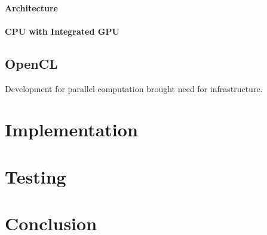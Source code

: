 \subsubsection*{Architecture}


\subsubsection*{CPU with Integrated GPU}


\section{OpenCL}
Development for parallel computation brought need for infrastructure\cite{opencl}.



\chapter{Implementation}



\chapter{Testing}





\chapter{Conclusion}


